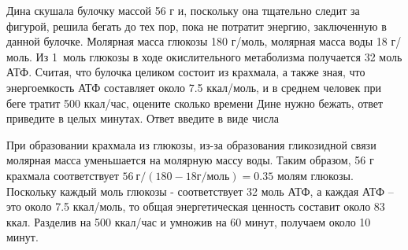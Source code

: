 
Дина
скушала булочку массой 56 г и, поскольку она тщательно следит за фигурой,
решила бегать до тех пор, пока не потратит энергию, заключенную в данной
булочке. Молярная масса глюкозы 180 г/моль, молярная масса воды 18 г/моль. Из 1~моль глюкозы в ходе окислительного метаболизма получается 32 моль АТФ. Считая,
что булочка целиком состоит из крахмала, а также зная, что энергоемкость
АТФ  составляет около 7.5 ккал/моль, и в
среднем человек при беге тратит 500 ккал/час, оцените сколько времени Дине
нужно бежать, ответ приведите в целых минутах. Ответ введите в виде числа

\solutionSection

При образовании крахмала из глюкозы, из-за образования гликозидной связи молярная 
масса уменьшается на молярную массу воды. Таким образом, 56 г крахмала соответствует 
$56 \: \text{г}/(180-18 \text{г/моль})=0.35$ молям глюкозы. Поскольку каждый моль глюкозы - соответствует 32 моль АТФ, 
а каждая АТФ – это около 7.5 ккал/моль, то общая энергетическая ценность составит около 83 ккал. 
Разделив на 500 ккал/час и умножив на 60 минут, получаем около 10 минут.

